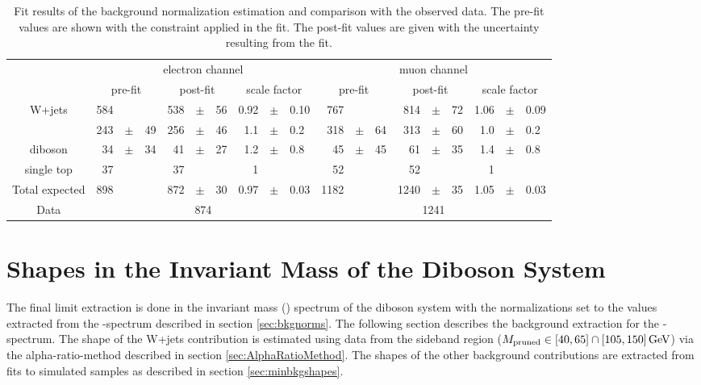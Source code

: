 \begin{table}
	\centering
	\caption[Fit results of the background normalization estimation]{Fit results of the background normalization estimation and comparison with the observed data. The pre-fit values are shown with the constraint applied in the fit. The post-fit values are given with the uncertainty resulting from the fit.\cite{PAS}}
	\label{tab:bkg:mjresults}
	\resizebox{0.95\columnwidth}{!}
	{%
	\begin{tabular}{cr@{\,}c@{\,}lr@{\,}c@{\,}lr@{\,}c@{\,}lr@{\,}c@{\,}lr@{\,}c@{\,}lr@{\,}c@{\,}l}
		\hline
        & \multicolumn{9}{c}{electron channel} & \multicolumn{9}{c}{muon channel} \\
		& \multicolumn{3}{c}{pre-fit} & \multicolumn{3}{c}{post-fit} & \multicolumn{3}{c}{scale factor} & \multicolumn{3}{c}{pre-fit} & \multicolumn{3}{c}{post-fit} & \multicolumn{3}{c}{scale factor} \\
		\hline
		W+jets             & 584 &     &    & 538 &$\pm$& 56 & 0.92 &$\pm$& 0.10 &  767 &     &    &  814 &$\pm$& 72 & 1.06 &$\pm$& 0.09 \\
		\ttbar             & 243 &$\pm$& 49 & 256 &$\pm$& 46 & 1.1  &$\pm$& 0.2  &  318 &$\pm$& 64 &  313 &$\pm$& 60 &  1.0 &$\pm$& 0.2  \\
		diboson            & 34  &$\pm$& 34 &  41 &$\pm$& 27 & 1.2  &$\pm$& 0.8  &   45 &$\pm$& 45 &   61 &$\pm$& 35 &  1.4 &$\pm$& 0.8  \\
		single top         & 37  &     &    &  37 &     &    & 1    &     &      &   52 &     &    &   52 &     &    &  1   &     &      \\
		\hline
		Total expected     & 898 &     &    & 872 &$\pm$& 30 & 0.97 &$\pm$& 0.03 & 1182 &     &    & 1240 &$\pm$& 35 & 1.05 &$\pm$& 0.03 \\
		Data               & \multicolumn{9}{c}{874} & \multicolumn{9}{c}{1241} \\
		\hline
	\end{tabular}
	}
\end{table}



\newpage
\section{Shapes in the Invariant Mass of the Diboson System}
The final limit extraction is done in the invariant mass (\MWV) spectrum of the diboson system with the normalizations set to the values extracted from the \Mpr -spectrum described in section \ref{sec:bkgnorms}. The following section describes the background extraction for the \MWV -spectrum. The shape of the W+jets contribution is estimated using data from the sideband region ($M_\mathrm{pruned} \in [40,65]\cap[105,150]\,{\rm GeV}$) via the alpha-ratio-method described in section \ref{sec:AlphaRatioMethod}. The shapes of the other background contributions are extracted from fits to simulated samples as described in section \ref{sec:minbkgshapes}.

